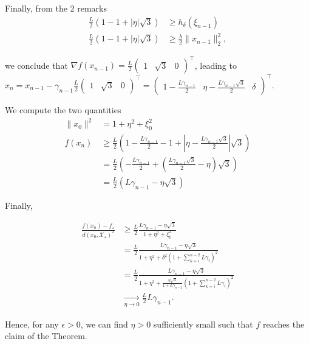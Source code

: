     Finally, from the 2 remarks
    \begin{align}
        \frac{L}{2}(1 - 1 + |\eta|\sqrt{3}) & \geq h_{\delta}(\xi_{n-1}) \\
        \frac{L}{2}(1 - 1 + |\eta|\sqrt{3}) & \geq \frac{\lambda}{2}\|x_{n-1}\|_2^2,
    \end{align}
    
    we conclude that $\nabla f(x_{n-1}) = \frac{L}{2} \begin{pmatrix} 1 & \sqrt{3} & 0 \end{pmatrix}^\top$, leading to $x_n = x_{n-1} - \gamma_{n-1} \frac{L}{2} \begin{pmatrix} 1 & \sqrt{3} & 0 \end{pmatrix}^\top = \begin{pmatrix} 1 - \frac{L\gamma_{n-1}}{2} & \eta - \frac{L\gamma_{n-1}\sqrt{3}}{2} & \delta \end{pmatrix}^\top$.
    
    We compute the two quantities
    \begin{align}
        \|x_0\|^2 & = 1 + \eta^2 + \xi_0^2 \\
        f(x_n) & \geq \frac{L}{2}\left(1 - \frac{L\gamma_{n-1}}{2} - 1 + |\eta - \frac{L\gamma_{n-1}\sqrt{3}}{2}|\sqrt{3}\right) \nonumber \\
        & = \frac{L}{2}\left(- \frac{L\gamma_{n-1}}{2} + \left(\frac{L\gamma_{n-1}\sqrt{3}}{2} - \eta\right)\sqrt{3}\right) \nonumber \\
        & = \frac{L}{2}\left(L\gamma_{n-1} - \eta\sqrt{3}\right)
    \end{align}
    
    Finally,
    
    \begin{align}
        \frac{f(x_n) - f_\star}{d(x_0, \mathcal{X}_\star)^2} & \geq \frac{L}{2} \frac{L\gamma_{n-1} - \eta\sqrt{3}}{1 + \eta^2 + \xi_0^2} \nonumber \\
        & = \frac{L}{2} \frac{L\gamma_{n-1} - \eta\sqrt{3}}{1 + \eta^2 + \delta^2 \left( 1 + \sum_{k=i}^{n-2} L \gamma_i \right)^2} \nonumber \\
        & = \frac{L}{2} \frac{L\gamma_{n-1} - \eta\sqrt{3}}{1 + \eta^2 + \frac{\eta\sqrt{3}}{1+L\gamma_{n-2}} \left( 1 + \sum_{k=i}^{n-2} L \gamma_i \right)^2} \nonumber \\
        & \underset{\eta \rightarrow 0}{\longrightarrow} \frac{L}{2}L\gamma_{n-1}.
    \end{align}
    
    Hence, for any $\epsilon >0$, we can find $\eta >0$ sufficiently small such that $f$ reaches the claim of the Theorem.
    
